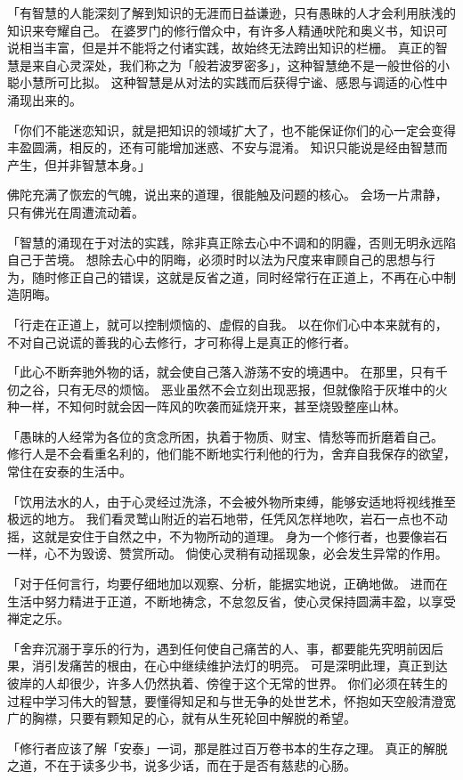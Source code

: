 \documentclass[twoside,openany]{book}
\begin{document}
「有智慧的人能深刻了解到知识的无涯而日益谦逊，只有愚昧的人才会利用肤浅的知识来夸耀自己。
在婆罗门的修行僧众中，有许多人精通吠陀和奥义书，知识可说相当丰富，但是并不能将之付诸实践，故始终无法跨出知识的栏栅。
真正的智慧是来自心灵深处，我们称之为「般若波罗密多」，这种智慧绝不是一般世俗的小聪小慧所可比拟。
这种智慧是从对法的实践而后获得宁谧、感恩与调适的心性中涌现出来的。

「你们不能迷恋知识，就是把知识的领域扩大了，也不能保证你们的心一定会变得丰盈圆满，相反的，还有可能增加迷惑、不安与混淆。
知识只能说是经由智慧而产生，但并非智慧本身。」

佛陀充满了恢宏的气魄，说出来的道理，很能触及问题的核心。
会场一片肃静，只有佛光在周遭流动着。

「智慧的涌现在于对法的实践，除非真正除去心中不调和的阴霾，否则无明永远陷自己于苦境。
想除去心中的阴晦，必须时时以法为尺度来审顾自己的思想与行为，随时修正自己的错误，这就是反省之道，同时经常行在正道上，不再在心中制造阴晦。

「行走在正道上，就可以控制烦恼的、虚假的自我。
以在你们心中本来就有的，不对自己说谎的善我的心去修行，才可称得上是真正的修行者。

「此心不断奔驰外物的话，就会使自己落入游荡不安的境遇中。
在那里，只有千仞之谷，只有无尽的烦恼。
恶业虽然不会立刻出现恶报，但就像陷于灰堆中的火种一样，不知何时就会因一阵风的吹袭而延烧开来，甚至烧毁整座山林。

「愚昧的人经常为各位的贪念所困，执着于物质、财宝、情愁等而折磨着自己。
修行人是不会看重名利的，他们能不断地实行利他的行为，舍弃自我保存的欲望，常住在安泰的生活中。

「饮用法水的人，由于心灵经过洗涤，不会被外物所束缚，能够安适地将视线推至极远的地方。
我们看灵鹫山附近的岩石地带，任凭风怎样地吹，岩石一点也不动摇，这就是安住于自然之中，不为物所动的道理。
身为一个修行者，也要像岩石一样，心不为毁谤、赞赏所动。
倘使心灵稍有动摇现象，必会发生异常的作用。

「对于任何言行，均要仔细地加以观察、分析，能据实地说，正确地做。
进而在生活中努力精进于正道，不断地祷念，不怠忽反省，使心灵保持圆满丰盈，以享受禅定之乐。

「舍弃沉溺于享乐的行为，遇到任何使自己痛苦的人、事，都要能先究明前因后果，消引发痛苦的根由，在心中继续维护法灯的明亮。
可是深明此理，真正到达彼岸的人却很少，许多人仍然执着、傍徨于这个无常的世界。
你们必须在转生的过程中学习伟大的智慧，要懂得知足和与世无争的处世艺术，怀抱如天空般清澄宽广的胸襟，只要有颗知足的心，就有从生死轮回中解脱的希望。

「修行者应该了解「安泰」一词，那是胜过百万卷书本的生存之理。
真正的解脱之道，不在于读多少书，说多少话，而在于是否有慈悲的心肠。
\end{document}

